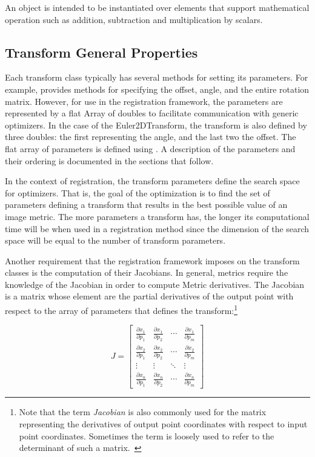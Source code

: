 An  object is intended to be instantiated over elements that
support mathematical operation such as addition, subtraction and multiplication
by scalars.


\subsection{Transform General Properties}
\label{sec:TransformGeneralProperties}

 Each transform class typically has
several methods for setting its parameters.  For example,
 provides methods for specifying the offset,
angle, and the entire rotation matrix.  However, for use in the
registration framework, the parameters are represented by a flat
Array of doubles to facilitate communication with generic
optimizers. In the case of the Euler2DTransform, the transform is also
defined by three doubles: the first representing the angle, and the last two the
offset. The flat array of parameters is defined using . A
description of the parameters and their ordering is documented in the 
sections that follow.
 
In the context of registration, the transform parameters define the search
space for optimizers. That is, the goal of the optimization is to find the set
of parameters defining a transform that results in the best possible value of
an image metric. The more parameters a transform has, the longer its
computational time will be when used in a registration method since the
dimension of the search space will be equal to the number of transform
parameters.


Another requirement that the registration framework imposes on the transform
classes is the computation of their Jacobians. In general, metrics require
the knowledge of the Jacobian in order to compute Metric derivatives.
The Jacobian is a matrix whose element are the partial derivatives of the
output point with respect to the array of parameters that defines the
transform:\footnote{Note that the term \emph{Jacobian} is also commonly used
for the matrix representing the derivatives of output point coordinates with
respect to input point coordinates. Sometimes the term is loosely used to
refer to the determinant of such a matrix.~\cite{Dodson1997}}

\begin{equation}
J=\left[ \begin{array}{cccc}
\frac{\partial x_{1}}{\partial p_{1}} & 
\frac{\partial x_{1}}{\partial p_{2}} & 
\cdots  & \frac{\partial x_{1}}{\partial p_{m}}\\
\frac{\partial x_{2}}{\partial p_{1}} & 
\frac{\partial x_{2}}{\partial p_{2}} & 
\cdots  & \frac{\partial x_{2}}{\partial p_{m}}\\
\vdots  & \vdots  & \ddots  & \vdots \\
\frac{\partial x_{n}}{\partial p_{1}} & 
\frac{\partial x_{n}}{\partial p_{2}} & 
\cdots  & \frac{\partial x_{n}}{\partial p_{m}}
\end{array}\right]
\end{equation}

